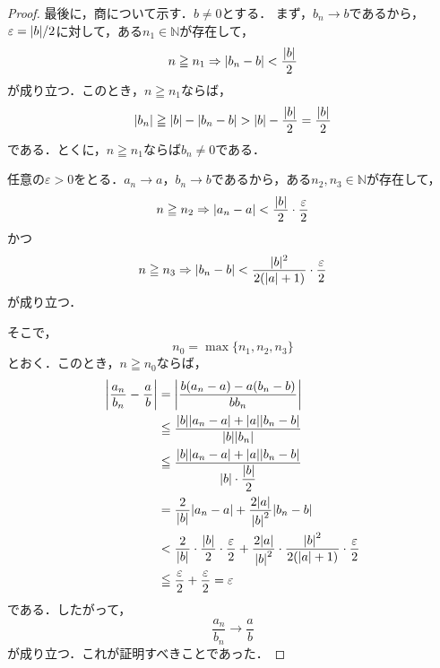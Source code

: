 \begin{tleftbar}
\begin{proof}
    最後に，商について示す．$b\ne 0$とする．
    まず，$b_n\to b$であるから，$\varepsilon=\lvert b\rvert/2$に対して，ある$n_1\in\mathbb{N}$が存在して，
    \[
      n\geqq n_1
      \limp
      \abs{b_n-b}<\frac{\abs{b}}{2}
    \]
    が成り立つ．このとき，$n\geqq n_1$ならば，
    \[
      \abs{b_n}
      \geqq \abs{b}-\abs{b_n-b}
      >\abs{b}-\frac{\abs{b}}{2}
      =\frac{\abs{b}}{2}
    \]
    である．とくに，$n \geqq n_1$ならば$b_n\ne 0$である．

    任意の$\varepsilon>0$をとる．$a_n\to a$，$b_n\to b$であるから，ある$n_2,n_3\in\mathbb{N}$が存在して，
    \[
      n\geqq n_2
      \limp
      \abs{a_n-a}<\frac{\abs{b}}{2}\cdot \frac{\varepsilon}{2}
    \]
    かつ
    \[
      n\geqq n_3
      \limp
      \abs{b_n-b}<\frac{\abs{b}^2}{2(\abs{a}+1)}\cdot \frac{\varepsilon}{2}
    \]
    が成り立つ．

    そこで，
    \[
      n_0=\max\{n_1,n_2,n_3\}
    \]
    とおく．このとき，$n\geqq n_0$ならば，
    \begin{align*}
      \abs*{\frac{a_n}{b_n}-\frac{a}{b}}
      &=\abs*{\frac{b(a_n-a)-a(b_n-b)}{bb_n}} \\
      &\leqq \frac{\abs*{b}\abs*{a_n-a}+\abs*{a}\abs*{b_n-b}}
                    {\abs*{b}\abs*{b_n}} \\
      &\leqq \frac{\abs*{b}\abs*{a_n-a}+\abs*{a}\abs*{b_n-b}}
               {\abs*{b}\cdot \dfrac{\abs*{b}}{2}} \\
      &= \frac{2}{\abs*{b}}\abs*{a_n-a}
         +\frac{2\abs*{a}}{\abs*{b}^2}\abs*{b_n-b} \\
      &< \frac{2}{\abs*{b}}\cdot\frac{\abs*{b}}{2}\cdot\frac{\varepsilon}{2}
         +\frac{2\abs*{a}}{\abs*{b}^2}\cdot
          \frac{\abs*{b}^2}{2(\abs*{a}+1)}\cdot\frac{\varepsilon}{2} \\
      &\leqq \frac{\varepsilon}{2}+\frac{\varepsilon}{2}
       =\varepsilon
    \end{align*}
    である．したがって，
    \[
      \frac{a_n}{b_n}\to\frac{a}{b}
    \]
    が成り立つ．これが証明すべきことであった．
  \end{proof}
\end{tleftbar}

